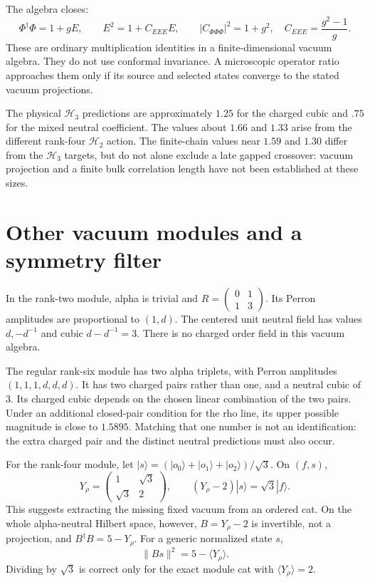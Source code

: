 The algebra closes:
\begin{equation}
 \Phi^\dagger\Phi=1+gE,\qquad
 E^2=1+C_{EEE}E,\qquad
 |C_{\Phi\Phi\Phi}|^2=1+g^2,
 \quad C_{EEE}=\frac{g^2-1}{g}.
 \label{eq:rank4-vacuum-identities}
\end{equation}
These are ordinary multiplication identities in a finite-dimensional
vacuum algebra. They do not use conformal invariance. A microscopic
operator ratio approaches them only if its source and selected states
converge to the stated vacuum projections.

The physical $\mathcal H_3$ predictions are approximately $1.25$ for the
charged cubic and $.75$ for the mixed neutral coefficient. The
values about $1.66$ and $1.33$ arise from the different rank-four
$\mathcal H_2$ action. The finite-chain values near $1.59$ and $1.30$ differ
from the $\mathcal H_3$ targets, but do not alone exclude a late gapped
crossover: vacuum projection and a finite bulk correlation length
have not been established at these sizes.

\section{Other vacuum modules and a symmetry filter}

In the rank-two module, alpha is trivial and
$R=\left(\begin{smallmatrix}0&1\\1&3\end{smallmatrix}\right)$.
Its Perron amplitudes are proportional to $(1,d)$. The centered
unit neutral field has values $d,-d^{-1}$ and cubic
$d-d^{-1}=3$. There is no charged order field in this vacuum
algebra.

The regular rank-six module has two alpha triplets, with Perron
amplitudes $(1,1,1,d,d,d)$. It has two charged pairs rather than
one, and a neutral cubic of $3$. Its charged cubic depends on the
chosen linear combination of the two pairs. Under an additional
closed-pair condition for the rho line, its upper possible magnitude
is close to $1.5895$. Matching that one number is not an
identification: the extra charged pair and the distinct neutral
predictions must also occur.

For the rank-four module, let
$|s\rangle=(|o_0\rangle+|o_1\rangle+|o_2\rangle)/\sqrt3$.
On $(f,s)$,
\[
 Y_\rho=\begin{pmatrix}1&\sqrt3\\\sqrt3&2\end{pmatrix},
 \qquad (Y_\rho-2)|s\rangle=\sqrt3|f\rangle.
\]
This suggests extracting the missing fixed vacuum from an ordered
cat. On the whole alpha-neutral Hilbert space, however,
$B=Y_\rho-2$ is invertible, not a projection, and
$B^\dagger B=5-Y_\rho$. For a generic normalized state $s$,
\[
 \|Bs\|^2=5-\langle Y_\rho\rangle.
\]
Dividing by $\sqrt3$ is correct only for the exact module cat with
$\langle Y_\rho\rangle=2$.

